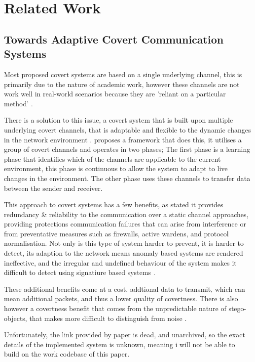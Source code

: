 \chapter{Related Work}
\label{ch:related_work}

\section{Towards Adaptive Covert Communication Systems}

Most proposed covert systems are based on a single underlying channel, this is primarily due to the nature of academic work, however these channels are not work well in real-world scenarios because they are 'reliant on a particular method' \cite{TWACCS}.

There is a solution to this issue, a covert system that is built upon multiple underlying covert channels, that is adaptable and flexible to the dynamic changes in the network environment \cite{TWACCS}. \cite{TWACCS} proposes a framework that does this, it utilises a group of covert channels and operates in two phases; The first phase is a learning phase that identifies which of the channels are applicable to the current environment, this phase is continuous to allow the system to adapt to live changes in the environment. The other phase uses these channels to transfer data between the sender and receiver.

This approach to covert systems has a few benefits, as stated it provides redundancy \& reliability \cite{TWACCS} to the communication over a static channel approaches, providing protections communication failures that can arise from interference or from preventative measures such as firewalls, active wardens, and protocol normalisation. Not only is this type of system harder to prevent, it is harder to detect, its adaption to the network means anomaly based systems are rendered ineffective, and the irregular and undefined behaviour of the system makes it difficult to detect using signatiure based systems \cite{TWACCS}.

These additional benefits come at a cost, addtional data to transmit, which can mean additional packets, and thus a lower quality of covertness. There is also however a covertness benefit that comes from the unpredictable nature of stego-objects, that makes more difficult to distinguish from noise \cite{ECopSSUOCC}.

Unfortunately, the link provided by paper is dead, and unarchived, so the exact details of the implemented system is unknown, meaning i will not be able to build on the work codebase of this paper.

